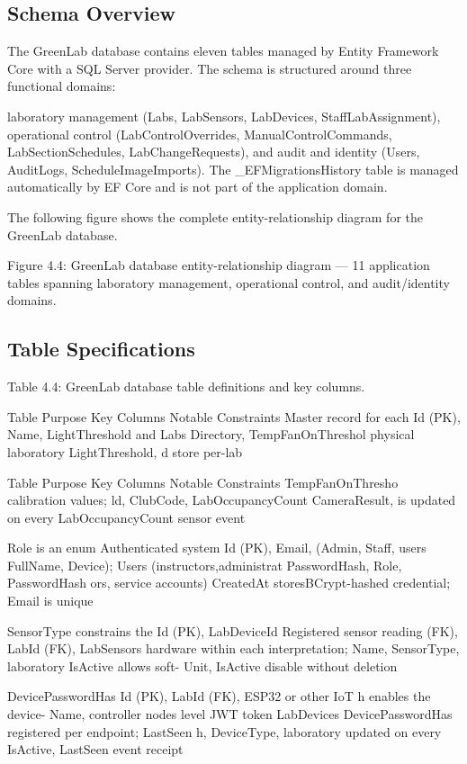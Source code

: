 \subsection{Schema Overview}


The GreenLab database contains eleven tables managed by Entity Framework Core with
a SQL Server provider. The schema is structured around three functional domains:


laboratory management (Labs, LabSensors, LabDevices, StaffLabAssignment),
operational control (LabControlOverrides, ManualControlCommands,
LabSectionSchedules, LabChangeRequests), and audit and identity (Users, AuditLogs,
ScheduleImageImports). The _EFMigrationsHistory table is managed automatically by EF
Core and is not part of the application domain.

The following figure shows the complete entity-relationship diagram for the GreenLab
database.




Figure 4.4: GreenLab database entity-relationship diagram --- 11 application tables
spanning laboratory management, operational control, and audit/identity domains.

\subsection{Table Specifications}


Table 4.4: GreenLab database table definitions and key columns.

Table Purpose Key Columns Notable Constraints
Master record for each Id (PK), Name, LightThreshold and
Labs Directory, TempFanOnThreshol
physical laboratory
LightThreshold, d store per-lab


Table Purpose Key Columns Notable Constraints
TempFanOnThresho calibration values;
ld, ClubCode, LabOccupancyCount
CameraResult, is updated on every
LabOccupancyCount sensor event

Role is an enum
Authenticated system Id (PK), Email, (Admin, Staff,
users FullName, Device);
Users
(instructors,administrat PasswordHash, Role, PasswordHash
ors, service accounts) CreatedAt storesBCrypt-hashed
credential; Email is
unique

SensorType
constrains the
Id (PK), LabDeviceId
Registered sensor reading
(FK), LabId (FK),
LabSensors hardware within each interpretation;
Name, SensorType,
laboratory IsActive allows soft-
Unit, IsActive
disable without
deletion

DevicePasswordHas
Id (PK), LabId (FK),
ESP32 or other IoT h enables the device-
Name,
controller nodes level JWT token
LabDevices DevicePasswordHas
registered per endpoint; LastSeen
h, DeviceType,
laboratory updated on every
IsActive, LastSeen
event receipt

